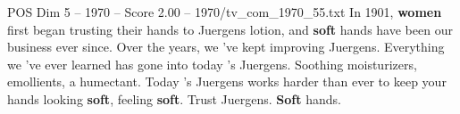 \begin{textsample}{POS Dim 5 – 1970 – Score 2.00 – 1970/tv\_com\_1970\_55.txt}  \label{ex:f5_pos_057}
In 1901, \textbf{women} first began trusting their hands to Juergens lotion, and \textbf{soft} hands have been our business ever since.
Over the years, we 've kept improving Juergens.
Everything we 've ever learned has gone into today 's Juergens.
Soothing moisturizers, emollients, a humectant.
Today 's Juergens works harder than ever to keep your hands looking \textbf{soft}, feeling \textbf{soft}.
Trust Juergens. \textbf{Soft} hands.

\end{textsample}

